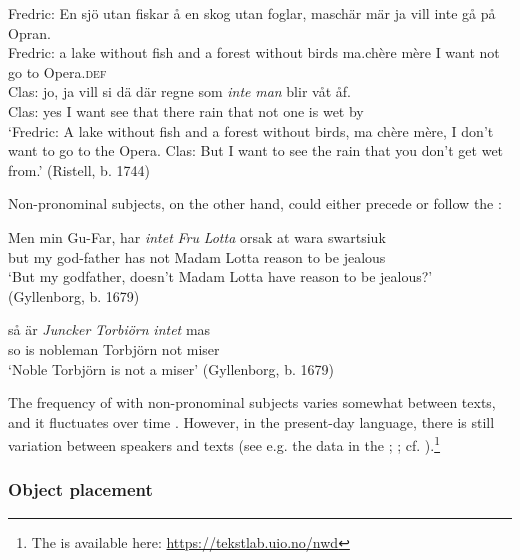 \documentclass[output=paper]{langscibook}
\begin{document}
\ex\label{ex:intro:14b}
\gll Fredric: En   sjö   utan     fiskar å     en skog     utan     foglar, maschär   mär ja   vill   inte  gå   på Opran.\\
    Fredric:  a     lake   without   fish   and   a   forest   without   birds ma.chère   mère I   want not  go   to Opera\textsc{.def}\\

\gll Clas: jo,   ja   vill   si     dä   där   regne   som \textit{inte} \textit{man} blir   våt   åf. \\
    Clas: yes   I   want   see   that   there   rain     that   not   one   is     wet   by\\

\glt `Fredric: A lake without fish and a forest without birds, ma chère mère, I don’t want to go to the Opera. Clas: But I want to see the rain that you don’t get wet from.’ (Ristell, b. 1744)
\z
\z

Non-pronominal subjects, on the other hand, could either precede or follow the :


\ea
\ea
\gll  Men   min Gu-Far,       har \textit{intet} \textit{Fru} \textit{Lotta} orsak   at   wara swartsiuk \\
but   my   god-father   has   not   Madam Lotta reason to be   jealous\\

\glt ‘But my godfather, doesn’t Madam Lotta have reason to be jealous?’ (Gyllenborg, b. 1679)

\ex
\gll  så   är \textit{Juncker} \textit{Torbiörn} \textit{intet} mas \\
    so is    nobleman    Torbjörn  not    miser\\
    \glt ‘Noble Torbjörn is not a miser’ (Gyllenborg, b. 1679)
\z
\z


The frequency of  with non-pronominal subjects varies somewhat between texts, and it fluctuates over time \citep{LarssonLundquist2021}. However, in the present-day language, there is still variation between speakers and texts (see e.g. the data in the ; \citealt{LundquistEtAl2019}; cf. \citealt{Andreasson2007}).\footnote{The  is available here: \url{https://tekstlab.uio.no/nwd}} 


\subsubsection{Object placement}\label{sec:intro:3.2.2}
\end{document}
